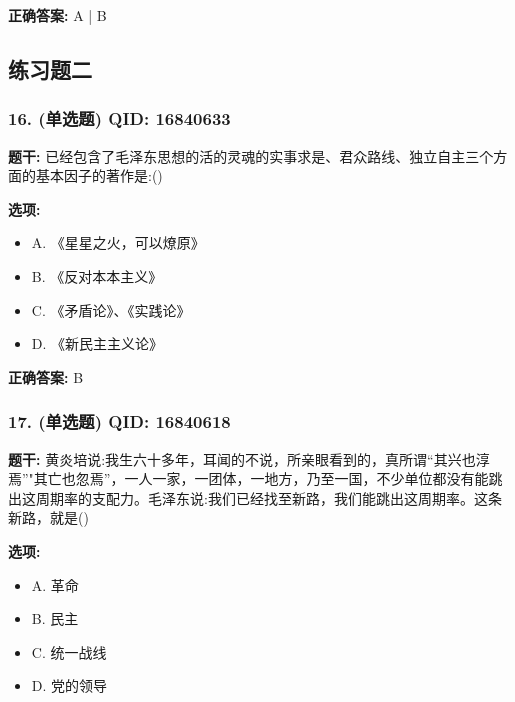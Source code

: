 \documentclass[12pt,UTF8]{ctexart}
\begin{document}
\textbf{正确答案:}
A | B

\vspace{0.3em}\hrulefill\vspace{0.7em}

\subsection*{练习题二}

\subsubsection*{16. (单选题) \small QID: 16840633}

\textbf{题干:}
已经包含了毛泽东思想的活的灵魂的实事求是、君众路线、独立自主三个方面的基本因子的著作是:()

\textbf{选项:}
\begin{itemize}[leftmargin=*]

  \item A. 《星星之火，可以燎原》

  \item B. 《反对本本主义》

  \item C. 《矛盾论》、《实践论》

  \item D. 《新民主主义论》

\end{itemize}

\textbf{正确答案:}
B

\vspace{0.3em}\hrulefill\vspace{0.7em}

\subsubsection*{17. (单选题) \small QID: 16840618}

\textbf{题干:}
黄炎培说:我生六十多年，耳闻的不说，所亲眼看到的，真所谓“其兴也淳焉”"其亡也忽焉”，一人一家，一团体，一地方，乃至一国，不少单位都没有能跳出这周期率的支配力。毛泽东说:我们已经找至新路，我们能跳出这周期率。这条新路，就是()

\textbf{选项:}
\begin{itemize}[leftmargin=*]

  \item A. 革命

  \item B. 民主

  \item C. 统一战线

  \item D. 党的领导

\end{itemize}
\end{document}
